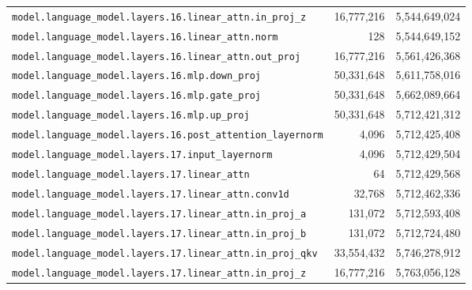 \documentclass[10pt,a4paper]{article}
\theoremstyle{definition}
\begin{document}
\begin{appendices}
\begin{longtable}{p{9.5cm}rr}
\texttt{model.\allowbreak{}language\_model.\allowbreak{}layers.\allowbreak{}16.\allowbreak{}linear\_attn.\allowbreak{}in\_proj\_z} & 16,777,216 & 5,544,649,024 \\
\texttt{model.\allowbreak{}language\_model.\allowbreak{}layers.\allowbreak{}16.\allowbreak{}linear\_attn.\allowbreak{}norm} & 128 & 5,544,649,152 \\
\texttt{model.\allowbreak{}language\_model.\allowbreak{}layers.\allowbreak{}16.\allowbreak{}linear\_attn.\allowbreak{}out\_proj} & 16,777,216 & 5,561,426,368 \\
\texttt{model.\allowbreak{}language\_model.\allowbreak{}layers.\allowbreak{}16.\allowbreak{}mlp.\allowbreak{}down\_proj} & 50,331,648 & 5,611,758,016 \\
\texttt{model.\allowbreak{}language\_model.\allowbreak{}layers.\allowbreak{}16.\allowbreak{}mlp.\allowbreak{}gate\_proj} & 50,331,648 & 5,662,089,664 \\
\texttt{model.\allowbreak{}language\_model.\allowbreak{}layers.\allowbreak{}16.\allowbreak{}mlp.\allowbreak{}up\_proj} & 50,331,648 & 5,712,421,312 \\
\texttt{model.\allowbreak{}language\_model.\allowbreak{}layers.\allowbreak{}16.\allowbreak{}post\_attention\_layernorm} & 4,096 & 5,712,425,408 \\
\texttt{model.\allowbreak{}language\_model.\allowbreak{}layers.\allowbreak{}17.\allowbreak{}input\_layernorm} & 4,096 & 5,712,429,504 \\
\texttt{model.\allowbreak{}language\_model.\allowbreak{}layers.\allowbreak{}17.\allowbreak{}linear\_attn} & 64 & 5,712,429,568 \\
\texttt{model.\allowbreak{}language\_model.\allowbreak{}layers.\allowbreak{}17.\allowbreak{}linear\_attn.\allowbreak{}conv1d} & 32,768 & 5,712,462,336 \\
\texttt{model.\allowbreak{}language\_model.\allowbreak{}layers.\allowbreak{}17.\allowbreak{}linear\_attn.\allowbreak{}in\_proj\_a} & 131,072 & 5,712,593,408 \\
\texttt{model.\allowbreak{}language\_model.\allowbreak{}layers.\allowbreak{}17.\allowbreak{}linear\_attn.\allowbreak{}in\_proj\_b} & 131,072 & 5,712,724,480 \\
\texttt{model.\allowbreak{}language\_model.\allowbreak{}layers.\allowbreak{}17.\allowbreak{}linear\_attn.\allowbreak{}in\_proj\_qkv} & 33,554,432 & 5,746,278,912 \\
\texttt{model.\allowbreak{}language\_model.\allowbreak{}layers.\allowbreak{}17.\allowbreak{}linear\_attn.\allowbreak{}in\_proj\_z} & 16,777,216 & 5,763,056,128 \\

\end{longtable}
\end{appendices}
\end{document}
